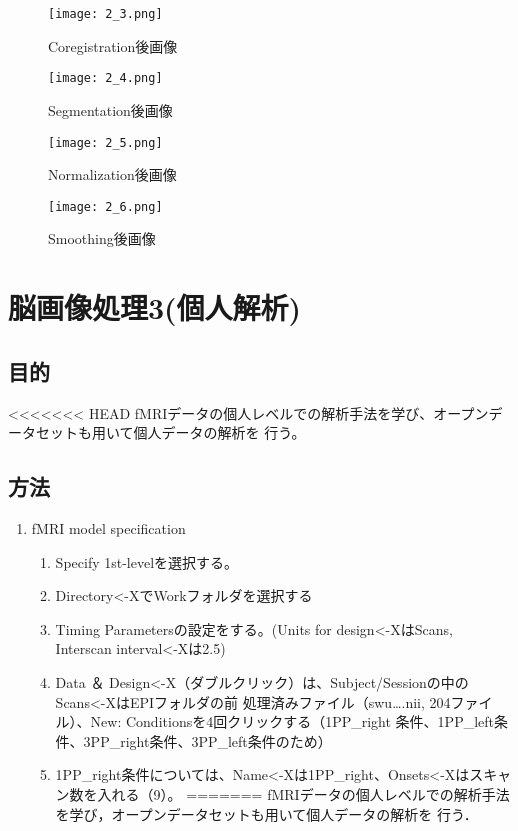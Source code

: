 \documentclass{jlreq}
\begin{document}
\begin{enumerate}
\begin{enumerate}
\begin{figure}[h]
    \centering
        \begin{minipage}{0.45\textwidth}
        \centering
        \texttt{[image: 2\_3.png]}
        \caption{Coregistration後画像}
        \label{fig:brain_T1}
    \end{minipage}
    \hfill
    \begin{minipage}{0.45\textwidth}
        \centering
        \texttt{[image: 2\_4.png]}
        \caption{Segmentation後画像}
        \label{fig:brain_T1}
    \end{minipage}
    \hfill
\end{figure}

\begin{figure}[H]
    \centering
        \begin{minipage}{0.45\textwidth}
        \centering
        \texttt{[image: 2\_5.png]}
        \caption{Normalization後画像}
        \label{fig:brain_T1}
    \end{minipage}
    \hfill
    \begin{minipage}{0.45\textwidth}
        \centering
        \texttt{[image: 2\_6.png]}
        \caption{Smoothing後画像}
        \label{fig:brain_T1}
    \end{minipage}
    \hfill
\end{figure}
\section{脳画像処理3(個人解析)}
\subsection{目的}
<<<<<<< HEAD
fMRIデータの個人レベルでの解析手法を学び、オープンデータセットも用いて個人データの解析を
行う。
\subsection{方法}
\begin{enumerate}
    \item fMRI model specification
    \begin{enumerate}
        \item Specify 1st-levelを選択する。
        \item Directory<-XでWorkフォルダを選択する
        \item Timing Parametersの設定をする。(Units for design<-XはScans, Interscan interval<-Xは2.5)
        \item Data ＆ Design<-X（ダブルクリック）は、Subject/Sessionの中のScans<-XはEPIフォルダの前
処理済みファイル（swu….nii, 204ファイル）、New: Conditionsを4回クリックする（1PP\_right
条件、1PP\_left条件、3PP\_right条件、3PP\_left条件のため）
        \item 1PP\_right条件については、Name<-Xは1PP\_right、Onsets<-Xはスキャン数を入れる（9）。
=======
fMRIデータの個人レベルでの解析手法を学び，オープンデータセットも用いて個人データの解析を
行う．

\end{enumerate}
\end{enumerate}
\end{enumerate}
\end{enumerate}
\end{document}
